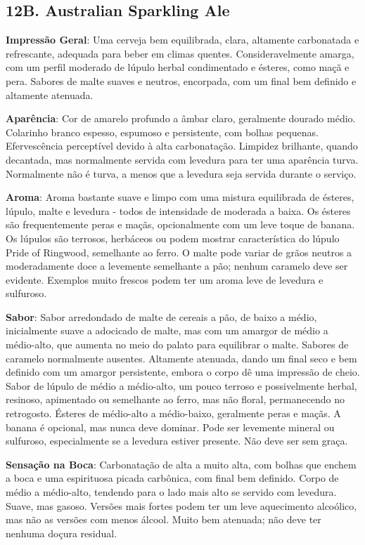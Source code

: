 \subsection*{12B. Australian Sparkling Ale}
\textbf{Impressão Geral}: Uma cerveja bem equilibrada, clara, altamente carbonatada e refrescante, adequada para beber em climas quentes. Consideravelmente amarga, com um perfil moderado de lúpulo herbal condimentado e ésteres, como maçã e pera. Sabores de malte suaves e neutros, encorpada, com um final bem definido e altamente atenuada.

\textbf{Aparência}: Cor de amarelo profundo a âmbar claro, geralmente dourado médio. Colarinho branco espesso, espumoso e persistente, com bolhas pequenas. Efervescência perceptível devido à alta carbonatação. Limpidez brilhante, quando decantada, mas normalmente servida com levedura para ter uma aparência turva. Normalmente não é turva, a menos que a levedura seja servida durante o serviço.

\textbf{Aroma}: Aroma bastante suave e limpo com uma mistura equilibrada de ésteres, lúpulo, malte e levedura - todos de intensidade de moderada a baixa. Os ésteres são frequentemente peras e maçãs, opcionalmente com um leve toque de banana. Os lúpulos são terrosos, herbáceos ou podem mostrar característica do lúpulo Pride of Ringwood, semelhante ao ferro. O malte pode variar de grãos neutros a moderadamente doce a levemente semelhante a pão; nenhum caramelo deve ser evidente. Exemplos muito frescos podem ter um aroma leve de levedura e sulfuroso.

\textbf{Sabor}: Sabor arredondado de malte de cereais a pão, de baixo a médio, inicialmente suave a adocicado de malte, mas com um amargor de médio a médio-alto, que aumenta no meio do palato para equilibrar o malte. Sabores de caramelo normalmente ausentes. Altamente atenuada, dando um final seco e bem definido com um amargor persistente, embora o corpo dê uma impressão de cheio. Sabor de lúpulo de médio a médio-alto, um pouco terroso e possivelmente herbal, resinoso, apimentado ou semelhante ao ferro, mas não floral, permanecendo no retrogosto. Ésteres de médio-alto a médio-baixo, geralmente peras e maçãs. A banana é opcional, mas nunca deve dominar. Pode ser levemente mineral ou sulfuroso, especialmente se a levedura estiver presente. Não deve ser sem graça.

\textbf{Sensação na Boca}: Carbonatação de alta a muito alta, com bolhas que enchem a boca e uma espirituosa picada carbônica, com final bem definido. Corpo de médio a médio-alto, tendendo para o lado mais alto se servido com levedura. Suave, mas gasoso. Versões mais fortes podem ter um leve aquecimento alcoólico, mas não as versões com menos álcool. Muito bem atenuada; não deve ter nenhuma doçura residual.

